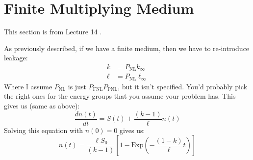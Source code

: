 \documentclass[letter]{article}
\begin{document}
\section{Finite Multiplying Medium}

This section is from Lecture 14 \cite{lecture}.

As previously described, if we have a finite medium, then we have to
re-introduce leakage:
\begin{equation*}
  \begin{split}
    k&=P_{\text{NL}}k_\infty \\
    \ell &= P_{\text{NL}}\ell_\infty
  \end{split}
\end{equation*}
Where I assume $P_{\text{NL}}$ is just $P_{\text{FNL}}P_{\text{PNL}}$,
but it isn't specified. You'd probably pick the right ones for the
energy groups that you assume your problem has. This gives us (same as
above):
\begin{equation*}
      \frac{dn(t)}{dt}=S(t)+\frac{(k-1)}{\ell}n(t)
\end{equation*}
Solving this equation with $n(0)=0$ gives us:
\begin{equation*}
  n(t)=\frac{\ell S_0}{(k-1)}\left[1-\text{Exp}\left(-\frac{(1-k)}{\ell}t\right)\right]
\end{equation*}





\end{document}
